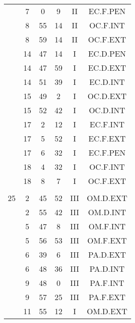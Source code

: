 \documentclass[12pt, a4paper]{article}
\begin{document}
\begin{multicols}{3}
{\begin{tabular}{c c c c c c}
	 	 	 	 & 7 & 0 & 9 & II & EC.F.PEN\\%
	 	 	 	 & 8 & 55 & 14 & II & OC.F.INT\\%
	 	 	 	 & 8 & 59 & 14 & II & OC.F.EXT\\%
	 	 	 	 & 14 & 47 & 14 & I & EC.D.PEN\\%
	 	 	 	 & 14 & 47 & 59 & I & EC.D.EXT\\%
	 	 	 	 & 14 & 51 & 39 & I & EC.D.INT\\%
	 	 	 	 & 15 & 49 & 2 & I & OC.D.EXT\\%
	 	 	 	 & 15 & 52 & 42 & I & OC.D.INT\\%
	 	 	 	 & 17 & 2 & 12 & I & EC.F.INT\\%
	 	 	 	 & 17 & 5 & 52 & I & EC.F.EXT\\%
	 	 	 	 & 17 & 6 & 32 & I & EC.F.PEN\\%
	 	 	 	 & 18 & 4 & 32 & I & OC.F.INT\\%
	 	 	 	 & 18 & 8 & 7 & I & OC.F.EXT\\%
	 	 	 	 & & & & & \\%
	 	 	 	25 & 2 & 45 & 52 & III & OM.D.EXT\\%
	 	 	 	 & 2 & 55 & 42 & III & OM.D.INT\\%
	 	 	 	 & 5 & 47 & 8 & III & OM.F.INT\\%
	 	 	 	 & 5 & 56 & 53 & III & OM.F.EXT\\%
	 	 	 	 & 6 & 39 & 6 & III & PA.D.EXT\\%
	 	 	 	 & 6 & 48 & 36 & III & PA.D.INT\\%
	 	 	 	 & 9 & 48 & 0 & III & PA.F.INT\\%
	 	 	 	 & 9 & 57 & 25 & III & PA.F.EXT\\%
	 	 	 	 & 11 & 55 & 12 & I & OM.D.EXT\\%

\end{tabular}}
\end{multicols}
\end{document}
